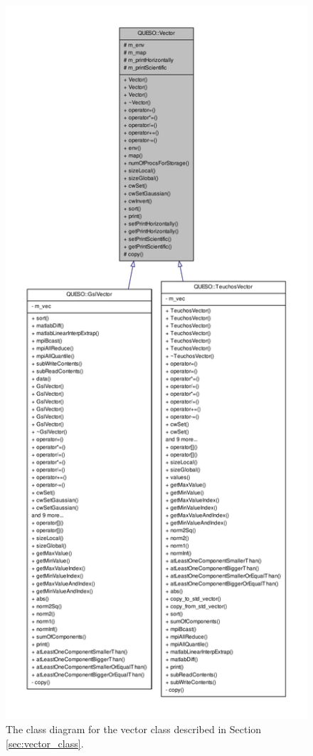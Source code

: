 \begin{figure}[!htpb]
\centering
\vspace*{-.5cm}
\includegraphics[scale=0.50,clip=true]{rawfigs/vector}
\vspace*{-.8cm}
\caption{ The class diagram for the vector class described in Section \ref{sec:vector_class}.}
\label{fig-vector-class}
\end{figure}




